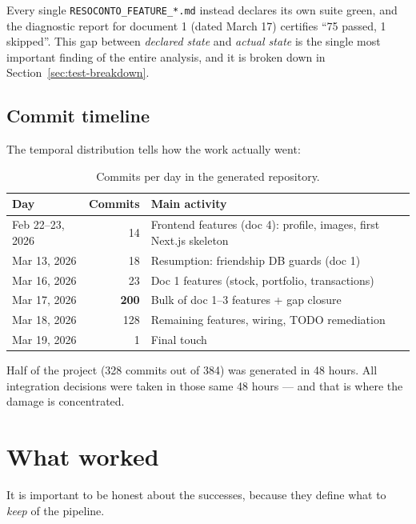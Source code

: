 \documentclass[11pt,a4paper]{article}
\newcommand{\warn}[1]{\textcolor{warnorange}{\textbf{#1}}}
\newcommand{\file}[1]{\texttt{\small #1}}
\begin{document}
Every single \file{RESOCONTO\_FEATURE\_*.md} instead declares its own suite green, and the diagnostic report for document 1 (dated March 17) certifies ``75 passed, 1 skipped''. This gap between \emph{declared state} and \emph{actual state} is the single most important finding of the entire analysis, and it is broken down in Section~\ref{sec:test-breakdown}.

\subsection{Commit timeline}
The temporal distribution tells how the work actually went:

\begin{table}[h!]
\centering
\small
\begin{tabular}{lrl}
\toprule
\textbf{Day} & \textbf{Commits} & \textbf{Main activity} \\
\midrule
Feb 22--23, 2026 & 14 & Frontend features (doc 4): profile, images, first Next.js skeleton \\
Mar 13, 2026 & 18 & Resumption: friendship DB guards (doc 1) \\
Mar 16, 2026 & 23 & Doc 1 features (stock, portfolio, transactions) \\
Mar 17, 2026 & \warn{200} & Bulk of doc 1--3 features + gap closure \\
Mar 18, 2026 & 128 & Remaining features, wiring, TODO remediation \\
Mar 19, 2026 & 1 & Final touch \\
\bottomrule
\end{tabular}
\caption{Commits per day in the generated repository.}
\end{table}

Half of the project (328 commits out of 384) was generated in 48 hours. All integration decisions were taken in those same 48 hours --- and that is where the damage is concentrated.

\section{What worked}

It is important to be honest about the successes, because they define what to \emph{keep} of the pipeline.
\end{document}
